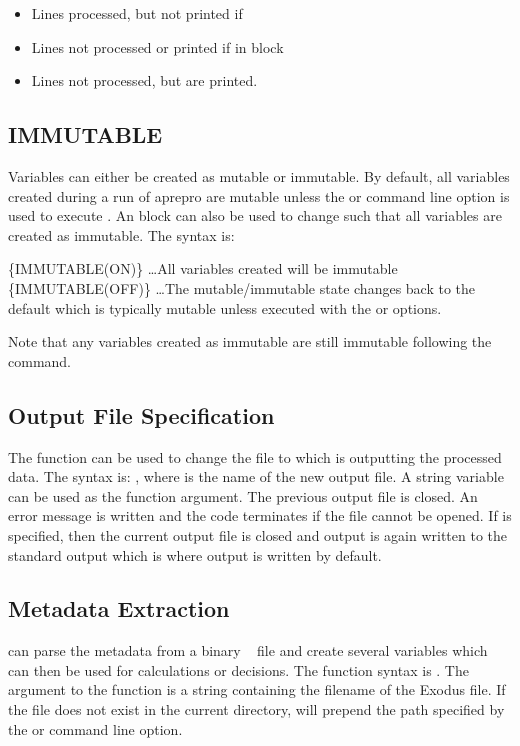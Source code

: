\begin{itemize}
\item {} Lines processed, but not printed if 
\item {} Lines not processed or printed if in  block
\item {} Lines not processed, but are printed.
\end{itemize}

\subsection{IMMUTABLE}\label{immutable_block} Variables can either be
created as mutable or immutable.  By default, all variables created
during a run of aprepro are mutable unless the  or
 command line option is used to execute \aprepro{}.  An
 block can also be used to change \aprepro{} such that
all variables are created as immutable.  The syntax is:
\begin{apinp}
\{IMMUTABLE(ON)\}
\ldots All variables created will be immutable
\{IMMUTABLE(OFF)\}
\ldots The mutable/immutable state changes back to the default which
is typically mutable unless \aprepro{} executed with the
 or  options.
\end{apinp}
Note that any variables created as immutable are still immutable
following the  command.

\subsection{Output File Specification} The  function can be used
to change the file to which \aprepro{} is outputting the processed
data.  The syntax is: , where
 is the name of the new output file. A string variable
can be used as the function argument. The previous output file is
closed. An error message is written and the code terminates if the
file cannot be opened. If  is specified,
then the current output file is closed and output is again written to
the standard output which is where output is written by default.

\subsection{\exo{} Metadata Extraction} \aprepro{} can parse the
metadata from a binary \exo{}~\cite{bib:exodus} file and create several
variables which can then be used for calculations or decisions.  The
function syntax is . The
argument to the function is a string containing the filename of the
Exodus file.  If the file does not exist in the current directory,
\aprepro{} will prepend the path specified by the  or
 command line option.

